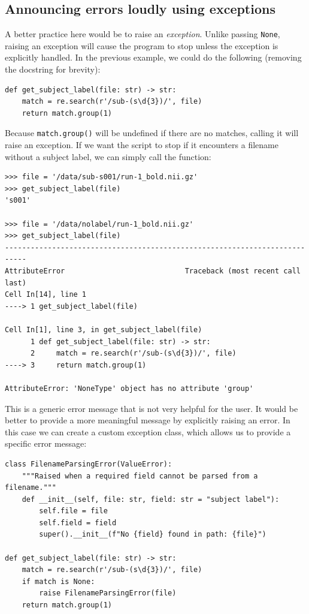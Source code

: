 \subsection{Announcing errors loudly using exceptions}

A better practice here would be to raise an \textit{exception}.
Unlike passing \texttt{None}, raising an exception will cause the program to stop unless the exception is explicitly handled.
In the previous example, we could do the following (removing the docstring for brevity):

\begin{lstlisting}[style=Pythonshort]
def get_subject_label(file: str) -> str:
    match = re.search(r'/sub-(s\d{3})/', file)
    return match.group(1)
\end{lstlisting}

Because \texttt{match.group()} will be undefined if there are no matches, calling it will raise an exception.  If we want the script to stop if it encounters a filename without a subject label, we can simply call the function:

\begin{lstlisting}[style=repl]
>>> file = '/data/sub-s001/run-1_bold.nii.gz'
>>> get_subject_label(file)
's001'

>>> file = '/data/nolabel/run-1_bold.nii.gz'
>>> get_subject_label(file)
---------------------------------------------------------------------------
AttributeError                            Traceback (most recent call last)
Cell In[14], line 1
----> 1 get_subject_label(file)

Cell In[1], line 3, in get_subject_label(file)
      1 def get_subject_label(file: str) -> str:
      2     match = re.search(r'/sub-(s\d{3})/', file)
----> 3     return match.group(1)

AttributeError: 'NoneType' object has no attribute 'group'
\end{lstlisting}

This is a generic error message that is not very helpful for the user. It would be better to provide a more meaningful message by explicitly raising an error.  In this case we can create a custom exception class, which allows us to provide a specific error message:

\begin{lstlisting}[style=Python]
class FilenameParsingError(ValueError):
    """Raised when a required field cannot be parsed from a filename."""
    def __init__(self, file: str, field: str = "subject label"):
        self.file = file
        self.field = field
        super().__init__(f"No {field} found in path: {file}")

def get_subject_label(file: str) -> str:
    match = re.search(r'/sub-(s\d{3})/', file)
    if match is None:
        raise FilenameParsingError(file)
    return match.group(1)
\end{lstlisting}

